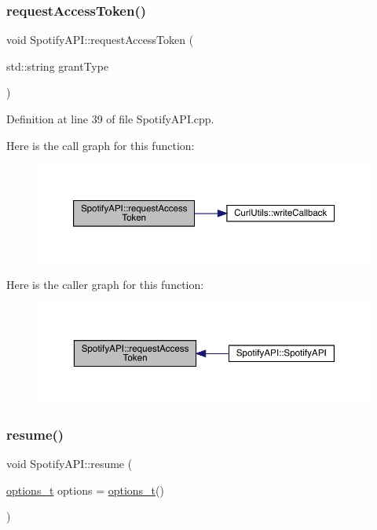 \subsubsection{\texorpdfstring{request\+Access\+Token()}{requestAccessToken()}}
{\footnotesize\ttfamily void Spotify\+A\+P\+I\+::request\+Access\+Token (\begin{DoxyParamCaption}\item[{std\+::string}]{grant\+Type }\end{DoxyParamCaption})\hspace{0.3cm}{\ttfamily [private]}}



Definition at line 39 of file Spotify\+A\+P\+I.\+cpp.

Here is the call graph for this function\+:
\nopagebreak
\begin{figure}[H]
\begin{center}
\leavevmode
\includegraphics[width=350pt]{class_spotify_a_p_i_ac7b630b1b98e6cfb047e7f107e862673_cgraph}
\end{center}
\end{figure}
Here is the caller graph for this function\+:
\nopagebreak
\begin{figure}[H]
\begin{center}
\leavevmode
\includegraphics[width=350pt]{class_spotify_a_p_i_ac7b630b1b98e6cfb047e7f107e862673_icgraph}
\end{center}
\end{figure}
\mbox{\label{class_spotify_a_p_i_a76aefe27840ecd6bc61a9841af90dbc5}} 
\subsubsection{\texorpdfstring{resume()}{resume()}}
{\footnotesize\ttfamily void Spotify\+A\+P\+I\+::resume (\begin{DoxyParamCaption}\item[{\mbox{\hyperlink{_spotify_a_p_i_8h_a0ff5cac1a4007bb330b7d9939650c283}{options\+\_\+t}}}]{options = {\ttfamily \mbox{\hyperlink{_spotify_a_p_i_8h_a0ff5cac1a4007bb330b7d9939650c283}{options\+\_\+t}}()} }\end{DoxyParamCaption})}



